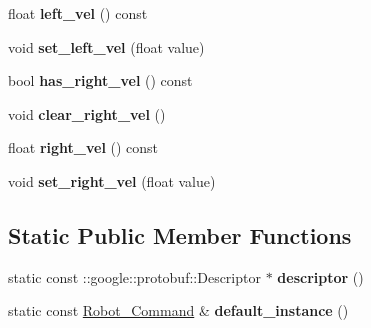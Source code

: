 \begin{DoxyCompactItemize}
\item 
float {\bfseries left\+\_\+vel} () const \hypertarget{classvss__command_1_1Robot__Command_a179ef683cadb10827e8112f2f1e174a5}{}\label{classvss__command_1_1Robot__Command_a179ef683cadb10827e8112f2f1e174a5}

\item 
void {\bfseries set\+\_\+left\+\_\+vel} (float value)\hypertarget{classvss__command_1_1Robot__Command_a2792ed641e6a25348fab7d26d989f670}{}\label{classvss__command_1_1Robot__Command_a2792ed641e6a25348fab7d26d989f670}

\item 
bool {\bfseries has\+\_\+right\+\_\+vel} () const \hypertarget{classvss__command_1_1Robot__Command_af192678ad6c73ff034b042275511d503}{}\label{classvss__command_1_1Robot__Command_af192678ad6c73ff034b042275511d503}

\item 
void {\bfseries clear\+\_\+right\+\_\+vel} ()\hypertarget{classvss__command_1_1Robot__Command_acdb3ec06b0b7183f192df01af72e70aa}{}\label{classvss__command_1_1Robot__Command_acdb3ec06b0b7183f192df01af72e70aa}

\item 
float {\bfseries right\+\_\+vel} () const \hypertarget{classvss__command_1_1Robot__Command_ad8e37a453b8729183b59a2bade49cc74}{}\label{classvss__command_1_1Robot__Command_ad8e37a453b8729183b59a2bade49cc74}

\item 
void {\bfseries set\+\_\+right\+\_\+vel} (float value)\hypertarget{classvss__command_1_1Robot__Command_a6e63f0df3268bde40f11d47ea167ceb3}{}\label{classvss__command_1_1Robot__Command_a6e63f0df3268bde40f11d47ea167ceb3}

\end{DoxyCompactItemize}
\subsection*{Static Public Member Functions}
\begin{DoxyCompactItemize}
\item 
static const \+::google\+::protobuf\+::\+Descriptor $\ast$ {\bfseries descriptor} ()\hypertarget{classvss__command_1_1Robot__Command_ad40c6b295898b078ff34e9966d89b6e5}{}\label{classvss__command_1_1Robot__Command_ad40c6b295898b078ff34e9966d89b6e5}

\item 
static const \hyperlink{classvss__command_1_1Robot__Command}{Robot\+\_\+\+Command} \& {\bfseries default\+\_\+instance} ()\hypertarget{classvss__command_1_1Robot__Command_a4c818a68a4bee11acbc7e7b5483ff4d7}{}\label{classvss__command_1_1Robot__Command_a4c818a68a4bee11acbc7e7b5483ff4d7}

\end{DoxyCompactItemize}
